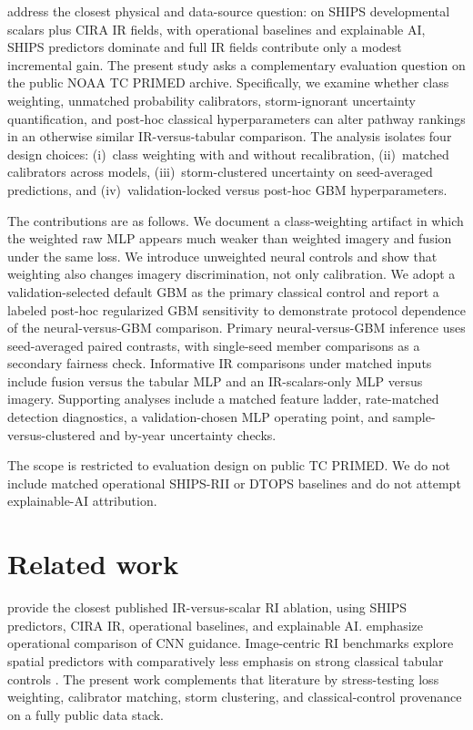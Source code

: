\documentclass[11pt]{article}
\begin{document}
\citet{lagerquist2025} address the closest physical and data-source question: on SHIPS developmental scalars plus CIRA IR fields, with operational baselines and explainable AI, SHIPS predictors dominate and full IR fields contribute only a modest incremental gain. The present study asks a complementary evaluation question on the public NOAA {TC PRIMED} archive. Specifically, we examine whether class weighting, unmatched probability calibrators, storm-ignorant uncertainty quantification, and post-hoc classical hyperparameters can alter pathway rankings in an otherwise similar IR-versus-tabular comparison. The analysis isolates four design choices: (i)~class weighting with and without recalibration, (ii)~matched calibrators across models, (iii)~storm-clustered uncertainty on seed-averaged predictions, and (iv)~validation-locked versus post-hoc GBM hyperparameters.

The contributions are as follows. We document a class-weighting artifact in which the weighted raw MLP appears much weaker than weighted imagery and fusion under the same loss. We introduce unweighted neural controls and show that weighting also changes imagery discrimination, not only calibration. We adopt a validation-selected default GBM as the primary classical control and report a labeled post-hoc regularized GBM sensitivity to demonstrate protocol dependence of the neural-versus-GBM comparison. Primary neural-versus-GBM inference uses seed-averaged paired contrasts, with single-seed member comparisons as a secondary fairness check. Informative IR comparisons under matched inputs include fusion versus the tabular MLP and an IR-scalars-only MLP versus imagery. Supporting analyses include a matched feature ladder, rate-matched detection diagnostics, a validation-chosen MLP operating point, and sample-versus-clustered and by-year uncertainty checks.

The scope is restricted to evaluation design on public {TC PRIMED}. We do not include matched operational SHIPS-RII or DTOPS baselines \citep{demaria2021,onderlinde2018} and do not attempt explainable-AI attribution.

\section{Related work}
\label{sec:related}

\citet{lagerquist2025} provide the closest published IR-versus-scalar RI ablation, using SHIPS predictors, CIRA IR, operational baselines, and explainable AI. \citet{griffin2022} emphasize operational comparison of CNN guidance. Image-centric RI benchmarks explore spatial predictors with comparatively less emphasis on strong classical tabular controls \citep{bai2020}. The present work complements that literature by stress-testing loss weighting, calibrator matching, storm clustering, and classical-control provenance on a fully public data stack.
\end{document}
